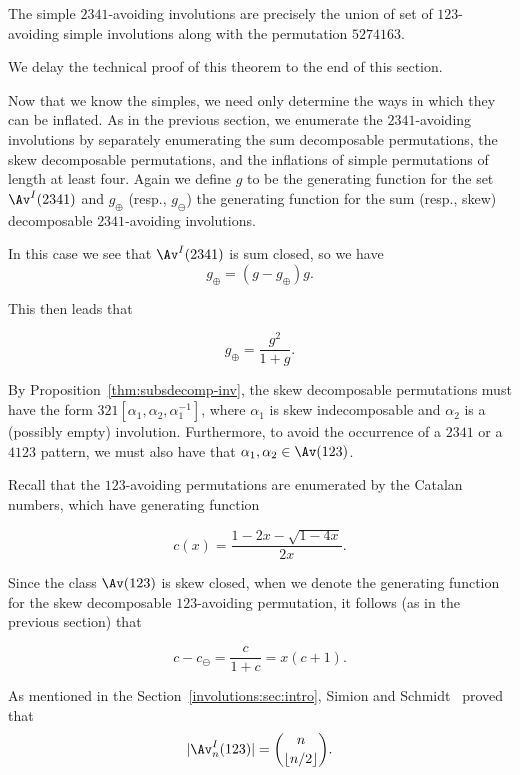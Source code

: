 \documentclass[12pt,twoside]{memoir}
\begin{document}
      \begin{theorem}\label{involutions:thm:2341simples}
        The simple $2341$-avoiding involutions are precisely the union of set of
        $123$-avoiding simple involutions along with the permutation $5274163$. 
      \end{theorem}

      We delay the technical proof of this theorem to the end of this section. 

      Now that we know the simples, we need only determine the ways in which they
      can be inflated. 
      As in the previous section, we enumerate the $2341$-avoiding involutions by
      separately enumerating the sum decomposable permutations, the skew decomposable
      permutations, and the inflations of simple permutations of length at least
      four. Again we define $g$ to be the generating function for the set
      $\Av^I(2341)$ and $g_\oplus$ (resp., $g_\ominus$) the generating function for
      the sum (resp., skew) decomposable $2341$-avoiding involutions.

      In this case we see that $\Av^I(2341)$ is sum closed, so we have
      $$ g_\oplus = (g - g_\oplus)g. $$

      This then leads that 

      \begin{equation}
        \label{involutions:eqn:2341-1}
        g_\oplus = \frac{g^2}{1+g}.
      \end{equation}

      By Proposition~\ref{thm:subsdecomp-inv}, the skew decomposable permutations
      must have the form $321[\alpha_1,\alpha_2,\alpha_1^{-1}]$, where $\alpha_1$ is
      skew indecomposable and $\alpha_2$ is a (possibly empty) involution.
      Furthermore, to avoid the occurrence of a $2341$ or a $4123$ pattern, we must
      also have that $\alpha_1,\alpha_2\in \Av(123)$.

      Recall that the $123$-avoiding permutations are enumerated by the Catalan numbers, which
      have generating function 

      $$ c(x) = \frac{1-2x-\sqrt{1-4x}}{2x}.$$

      Since the class $\Av(123)$ is skew closed, when we denote the generating
      function for the skew decomposable $123$-avoiding permutation, it follows
      (as in the previous section) that

      $$ c-c_\ominus = \frac{c}{1+c} = x(c+1).$$


      As mentioned in the Section~\ref{involutions:sec:intro}, Simion and
      Schmidt~\cite{Simion1985} proved that
      $$ |\Av^I_n(123)|={n\choose \lfloor n/2\rfloor}. $$
\end{document}
